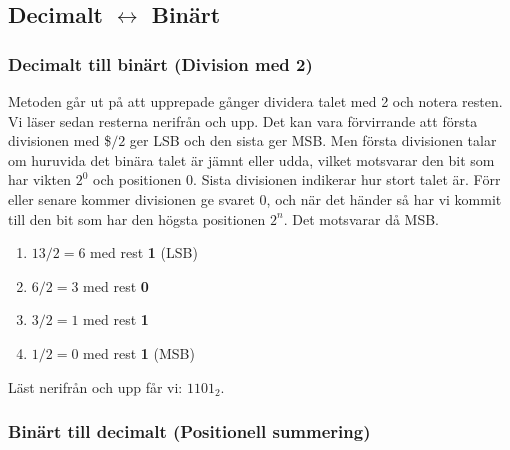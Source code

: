 \documentclass[
  swedish,
  letterpaper,
  oneside,
  openany]{book}
\providecommand{\tightlist}{%
  \setlength{\itemsep}{0pt}\setlength{\parskip}{0pt}}
\begin{document}
\subsection{\texorpdfstring{Decimalt \(\leftrightarrow\)
Binärt}{Decimalt \textbackslash leftrightarrow Binärt}}\label{decimalt-leftrightarrow-binuxe4rt}

\subsubsection{Decimalt till binärt (Division med
2)}\label{decimalt-till-binuxe4rt-division-med-2}

Metoden går ut på att upprepade gånger dividera talet med 2 och notera
resten. Vi läser sedan resterna nerifrån och upp. Det kan vara
förvirrande att första divisionen med \$\(/ 2\) ger LSB och den sista
ger MSB. Men första divisionen talar om huruvida det binära talet är
jämnt eller udda, vilket motsvarar den bit som har vikten \(2^0\) och
positionen \(0\). Sista divisionen indikerar hur stort talet är. Förr
eller senare kommer divisionen ge svaret \(0\), och när det händer så
har vi kommit till den bit som har den högsta positionen \(2^n\). Det
motsvarar då MSB.

\begin{tcolorbox}[enhanced jigsaw, arc=.35mm, bottomrule=.15mm, bottomtitle=1mm, breakable, colback=white, colbacktitle=quarto-callout-note-color!10!white, colframe=quarto-callout-note-color-frame, coltitle=black, left=2mm, leftrule=.75mm, opacityback=0, opacitybacktitle=0.6, rightrule=.15mm, title=\textcolor{quarto-callout-note-color}{\faInfo}\hspace{0.5em}{Exempel: Omvandla \(13_{10}\) till binärt}, titlerule=0mm, toprule=.15mm, toptitle=1mm]

\begin{enumerate}
\def\labelenumi{\arabic{enumi}.}
\tightlist
\item
  \(13 / 2 = 6\) med rest \textbf{1} (LSB)
\item
  \(6 / 2 = 3\) med rest \textbf{0}
\item
  \(3 / 2 = 1\) med rest \textbf{1}
\item
  \(1 / 2 = 0\) med rest \textbf{1} (MSB)
\end{enumerate}

Läst nerifrån och upp får vi: \(1101_2\).

\end{tcolorbox}

\subsubsection{Binärt till decimalt (Positionell
summering)}\label{binuxe4rt-till-decimalt-positionell-summering}
\end{document}
